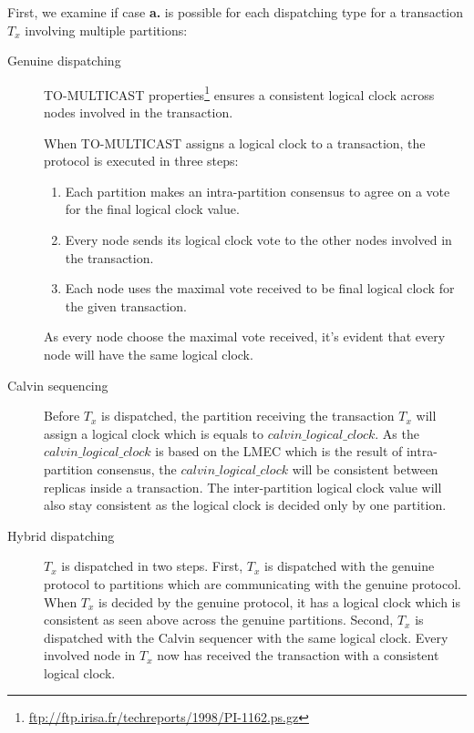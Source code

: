 \documentclass[a4paper, 10pt]{article}
\begin{document}
First, we examine if case \textbf{a.} is possible for each dispatching type for a transaction $T_x$
involving multiple partitions:

\begin{description}
    \item[Genuine dispatching] TO-MULTICAST properties\footnote{\url{ftp://ftp.irisa.fr/techreports/1998/PI-1162.ps.gz}}
        ensures a consistent logical clock across nodes involved in the transaction.

        When TO-MULTICAST assigns a logical clock to a transaction, the protocol is executed in three steps:
        \begin{enumerate}
            \item Each partition makes an intra-partition consensus to agree on a vote
                for the final logical clock value.
            \item Every node sends its logical clock vote to the other nodes involved in the transaction.
            \item Each node uses the maximal vote received to be final logical clock
                for the given transaction.
        \end{enumerate}
        As every node choose the maximal vote received, it's evident that every node will have the
        same logical clock.

    \item[Calvin sequencing] Before $T_x$ is dispatched, the partition receiving the transaction $T_x$ will assign
        a logical clock which is equals to $calvin\_logical\_clock$. As the $calvin\_logical\_clock$ is
        based on the LMEC which is the result of intra-partition consensus, the $calvin\_logical\_clock$ will
        be consistent between replicas inside a transaction. The inter-partition logical clock value will also stay
        consistent as the logical clock is decided only by one partition.

    \item[Hybrid dispatching] $T_x$ is dispatched in two steps. First, $T_x$ is dispatched with
        the genuine protocol to partitions which are communicating with the genuine protocol.
        When $T_x$ is decided by the genuine protocol, it has a logical clock which is consistent as seen above
        across the genuine partitions. Second, $T_x$ is dispatched with the Calvin sequencer with the same logical
        clock. Every involved node in $T_x$ now has received the transaction with a consistent logical clock.
\end{description}
\end{document}

